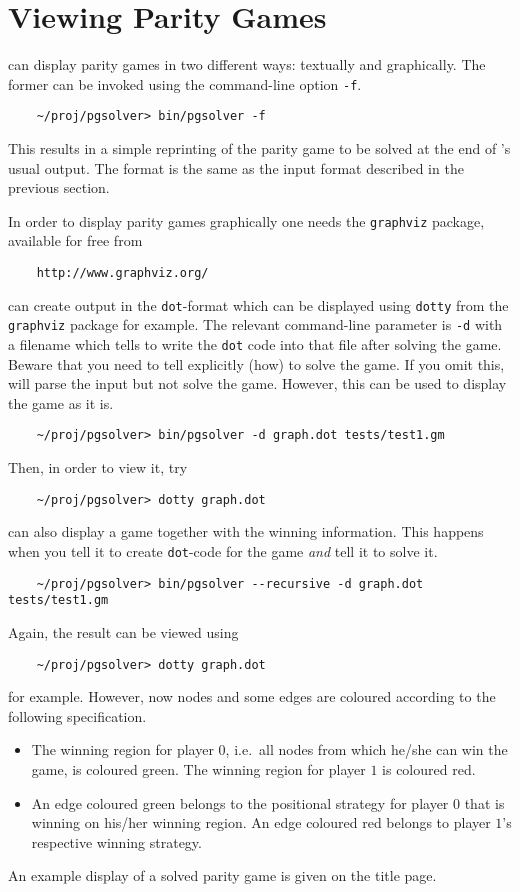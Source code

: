 \section{Viewing Parity Games}
\label{sec:viewing}

\pgsolver can display parity games in two different ways: textually and graphically. The former
can be invoked using the command-line option \texttt{-f}.
\begin{verbatim}
    ~/proj/pgsolver> bin/pgsolver -f 
\end{verbatim}
This results in a simple reprinting of the parity game to be solved at the end of \pgsolver's usual
output. The format is the same as the input format described in the previous section.

In order to display parity games graphically one needs the \texttt{graphviz} package, available for
free from
\begin{verbatim}
    http://www.graphviz.org/
\end{verbatim}
\pgsolver can create output in the \texttt{dot}-format which can be displayed using \texttt{dotty} from
the \texttt{graphviz} package for example. The relevant command-line parameter is \texttt{-d} with
a filename which tells \pgsolver to write the \texttt{dot} code into that file after solving the game.
Beware that you need to tell \pgsolver explicitly (how) to solve the game. If you omit this, \pgsolver
will parse the input but not solve the game. However, this can be used to display the game as it is.
\begin{verbatim}
    ~/proj/pgsolver> bin/pgsolver -d graph.dot tests/test1.gm
\end{verbatim}
Then, in order to view it, try
\begin{verbatim}
    ~/proj/pgsolver> dotty graph.dot
\end{verbatim}
\pgsolver can also display a game together with the winning information. This happens when you tell it
to create \texttt{dot}-code for the game \emph{and} tell it to solve it.
\begin{verbatim}
    ~/proj/pgsolver> bin/pgsolver --recursive -d graph.dot tests/test1.gm
\end{verbatim}
Again, the result can be viewed using
\begin{verbatim}
    ~/proj/pgsolver> dotty graph.dot
\end{verbatim}
for example. However, now nodes and some edges are coloured according to the following specification.
\begin{itemize}
\item The winning region for player $0$, i.e.\ all nodes from which he/she can win the game, is coloured 
      green. The winning region for player $1$ is coloured red.
\item An edge coloured green belongs to the positional strategy for player $0$ that is winning on his/her
      winning region. An edge coloured red belongs to player $1$'s respective winning strategy.
\end{itemize}
An example display of a solved parity game is given on the title page.



